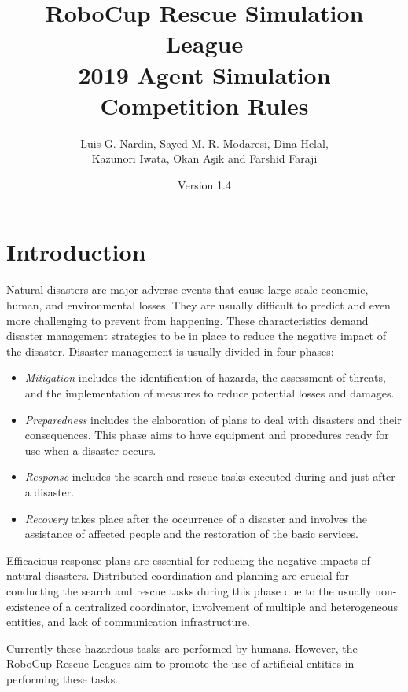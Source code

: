 \documentclass{article}
\begin{document}
\title{RoboCup Rescue Simulation League\\
       2019 Agent Simulation Competition Rules}
\author{Luis G. Nardin, Sayed M. R. Modaresi, Dina Helal,\\
Kazunori Iwata, Okan A{\c s}ik and Farshid Faraji}
\date{Version 1.4}
\maketitle
\section{Introduction}
\label{sec:introduction}
Natural disasters are major adverse events that cause large-scale economic, human, and environmental losses. They are usually difficult to predict and even more challenging to prevent from happening. These characteristics demand disaster management strategies to be in place to reduce the negative impact of the disaster. Disaster management is usually divided in four phases:
\begin{itemize}
\item \emph{Mitigation} includes the identification of hazards, the assessment of threats, and the implementation of measures to reduce potential losses and damages.
\item \emph{Preparedness} includes the elaboration of plans to deal with disasters and their consequences. This phase aims to have equipment and procedures ready for use when a disaster occurs.
\item \emph{Response} includes the search and rescue tasks executed during and just after a disaster.
\item \emph{Recovery} takes place after the occurrence of a disaster and involves the assistance of affected people and the restoration of the basic services.
\end{itemize}

Efficacious response plans are essential for reducing the negative impacts of natural disasters. Distributed coordination and planning are crucial for conducting the search and rescue tasks during this phase due to the usually non-existence of a centralized coordinator, involvement of multiple and heterogeneous entities, and lack of communication infrastructure.

Currently these hazardous tasks are performed by humans. However, the RoboCup Rescue Leagues aim to promote the use of artificial entities in performing these tasks.
\end{document}
